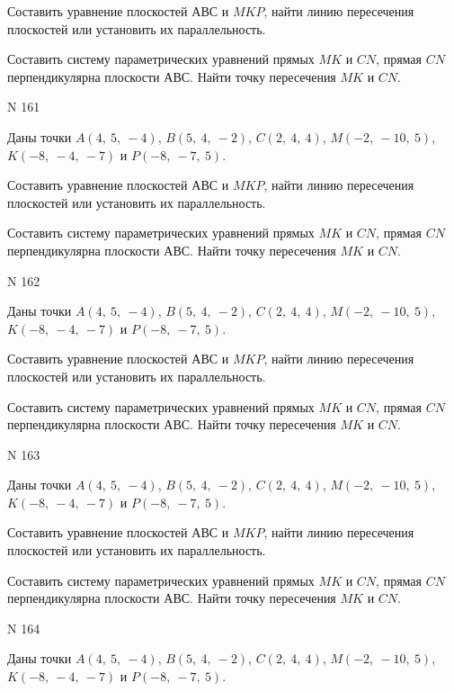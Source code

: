 \documentclass[11pt]{report}
\begin{document}
Составить уравнение плоскостей $АВС$ и $MKP$,
найти линию пересечения плоскостей или установить их параллельность.

Составить систему параметрических уравнений прямых $MK$ и $CN$,
прямая $CN$ перпендикулярна плоскости $АВС$. 
Найти точку пересечения $MK$ и $CN$.



 N 161

Даны точки $A\left( 4, \  5, \  -4\right)$, $B\left( 5, \  4, \  -2\right)$, $C\left( 2, \  4, \  4\right)$, $M\left( -2, \  -10, \  5\right)$, $K\left( -8, \  -4, \  -7\right)$ и $P\left( -8, \  -7, \  5\right)$.


Составить уравнение плоскостей $АВС$ и $MKP$,
найти линию пересечения плоскостей или установить их параллельность.

Составить систему параметрических уравнений прямых $MK$ и $CN$,
прямая $CN$ перпендикулярна плоскости $АВС$. 
Найти точку пересечения $MK$ и $CN$.



 N 162

Даны точки $A\left( 4, \  5, \  -4\right)$, $B\left( 5, \  4, \  -2\right)$, $C\left( 2, \  4, \  4\right)$, $M\left( -2, \  -10, \  5\right)$, $K\left( -8, \  -4, \  -7\right)$ и $P\left( -8, \  -7, \  5\right)$.


Составить уравнение плоскостей $АВС$ и $MKP$,
найти линию пересечения плоскостей или установить их параллельность.

Составить систему параметрических уравнений прямых $MK$ и $CN$,
прямая $CN$ перпендикулярна плоскости $АВС$. 
Найти точку пересечения $MK$ и $CN$.



 N 163

Даны точки $A\left( 4, \  5, \  -4\right)$, $B\left( 5, \  4, \  -2\right)$, $C\left( 2, \  4, \  4\right)$, $M\left( -2, \  -10, \  5\right)$, $K\left( -8, \  -4, \  -7\right)$ и $P\left( -8, \  -7, \  5\right)$.


Составить уравнение плоскостей $АВС$ и $MKP$,
найти линию пересечения плоскостей или установить их параллельность.

Составить систему параметрических уравнений прямых $MK$ и $CN$,
прямая $CN$ перпендикулярна плоскости $АВС$. 
Найти точку пересечения $MK$ и $CN$.



 N 164

Даны точки $A\left( 4, \  5, \  -4\right)$, $B\left( 5, \  4, \  -2\right)$, $C\left( 2, \  4, \  4\right)$, $M\left( -2, \  -10, \  5\right)$, $K\left( -8, \  -4, \  -7\right)$ и $P\left( -8, \  -7, \  5\right)$.
\end{document}
